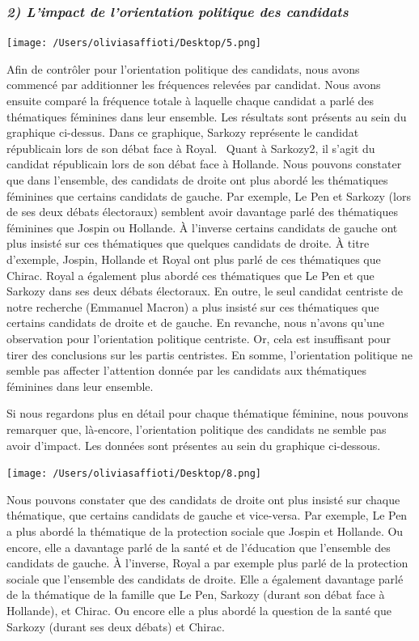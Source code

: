 \documentclass[
  letterpaper,
  DIV=11,
  numbers=noendperiod]{scrartcl}
\begin{document}
\hypertarget{limpact-de-lorientation-politique-des-candidats}{%
\subsubsection{\texorpdfstring{\emph{2) L'impact de l'orientation
politique des
candidats}}{2) L'impact de l'orientation politique des candidats}}\label{limpact-de-lorientation-politique-des-candidats}}

\texttt{[image: /Users/oliviasaffioti/Desktop/5.png]}

Afin de contrôler pour l'orientation politique des candidats, nous avons
commencé par additionner les fréquences relevées par candidat. Nous
avons ensuite comparé la fréquence totale à laquelle chaque candidat a
parlé des thématiques féminines dans leur ensemble. Les résultats sont
présents au sein du graphique ci-dessus. Dans ce graphique, Sarkozy
représente le candidat républicain lors de son débat face à Royal.
~Quant à Sarkozy2, il s'agit du candidat républicain lors de son débat
face à Hollande. Nous pouvons constater que dans l'ensemble, des
candidats de droite ont plus abordé les thématiques féminines que
certains candidats de gauche. Par exemple, Le Pen et Sarkozy (lors de
ses deux débats électoraux) semblent avoir davantage parlé des
thématiques féminines que Jospin ou Hollande. À l'inverse certains
candidats de gauche ont plus insisté sur ces thématiques que quelques
candidats de droite. À titre d'exemple, Jospin, Hollande et Royal ont
plus parlé de ces thématiques que Chirac. Royal a également plus abordé
ces thématiques que Le Pen et que Sarkozy dans ses deux débats
électoraux. En outre, le seul candidat centriste de notre recherche
(Emmanuel Macron) a plus insisté sur ces thématiques que certains
candidats de droite et de gauche. En revanche, nous n'avons qu'une
observation pour l'orientation politique centriste. Or, cela est
insuffisant pour tirer des conclusions sur les partis centristes. En
somme, l'orientation politique ne semble pas affecter l'attention donnée
par les candidats aux thématiques féminines dans leur ensemble.

Si nous regardons plus en détail pour chaque thématique féminine, nous
pouvons remarquer que, là-encore, l'orientation politique des candidats
ne semble pas avoir d'impact. Les données sont présentes au sein du
graphique ci-dessous.

\texttt{[image: /Users/oliviasaffioti/Desktop/8.png]}

Nous pouvons constater que des candidats de droite ont plus insisté sur
chaque thématique, que certains candidats de gauche et vice-versa. Par
exemple, Le Pen a plus abordé la thématique de la protection sociale que
Jospin et Hollande. Ou encore, elle a davantage parlé de la santé et de
l'éducation que l'ensemble des candidats de gauche. À l'inverse, Royal a
par exemple plus parlé de la protection sociale que l'ensemble des
candidats de droite. Elle a également davantage parlé de la thématique
de la famille que Le Pen, Sarkozy (durant son débat face à Hollande), et
Chirac. Ou encore elle a plus abordé la question de la santé que Sarkozy
(durant ses deux débats) et Chirac.
\end{document}
